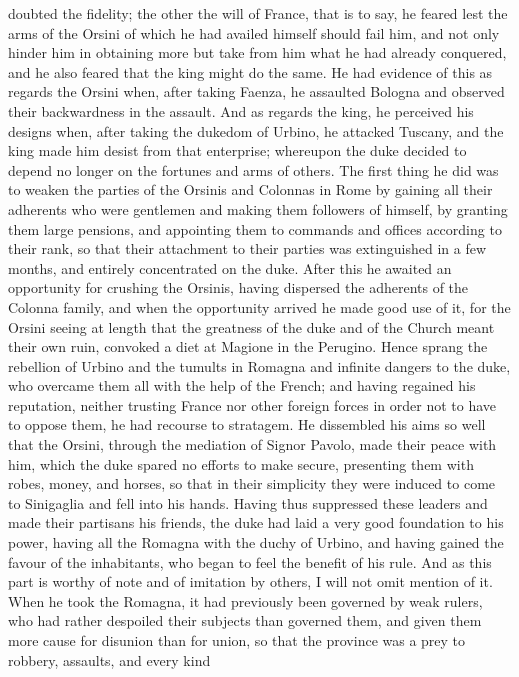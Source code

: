 \documentclass[12pt,letterpaper]{memoir}
\begin{document}
doubted the fidelity; the other the will of France, that is to say,
he feared lest the arms of the Orsini of which he had availed himself
should fail him, and not only hinder him in obtaining more but take
from him what he had already conquered, and he also feared that the
king might do the same. He had evidence of this as regards the Orsini
when, after taking Faenza, he assaulted Bologna and observed their
backwardness in the assault. And as regards the king, he perceived his
designs when, after taking the dukedom of Urbino, he attacked Tuscany,
and the king made him desist from that enterprise; whereupon the
duke decided to depend no longer on the fortunes and arms of others.
The first thing he did was to weaken the parties of the Orsinis and
Colonnas in Rome by gaining all their adherents who were gentlemen and
making them followers of himself, by granting them large pensions,
and appointing them to commands and offices according to their rank,
so that their attachment to their parties was extinguished in a few
months, and entirely concentrated on the duke. After this he awaited an
opportunity for crushing the Orsinis, having dispersed the adherents of
the Colonna family, and when the opportunity arrived he made good use
of it, for the Orsini seeing at length that the greatness of the duke
and of the Church meant their own ruin, convoked a diet at Magione in
the Perugino. Hence sprang the rebellion of Urbino and the tumults in
Romagna and infinite dangers to the duke, who overcame them all with
the help of the French; and having regained his reputation, neither
trusting France nor other foreign forces in order not to have to oppose
them, he had recourse to stratagem. He dissembled his aims so well that
the Orsini, through the mediation of Signor Pavolo, made their peace
with him, which the duke spared no efforts to make secure, presenting
them with robes, money, and horses, so that in their simplicity they
were induced to come to Sinigaglia and fell into his hands. Having
thus suppressed these leaders and made their partisans his friends,
the duke had laid a very good foundation to his power, having all the
Romagna with the duchy of Urbino, and having gained the favour of
the inhabitants, who began to feel the benefit of his rule. And as
this part is worthy of note and of imitation by others, I will not
omit mention of it. When he took the Romagna, it had previously been
governed by weak rulers, who had rather despoiled their subjects than
governed them, and given them more cause for disunion than for union,
so that the province was a prey to robbery, assaults, and every kind
\end{document}
